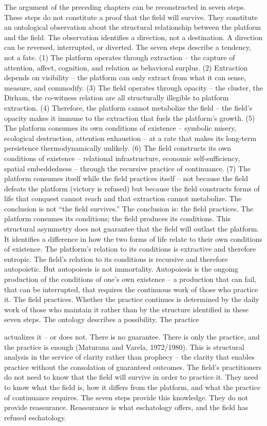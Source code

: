 The argument of the preceding chapters can be reconstructed in seven steps. These steps do not constitute a proof that the field will survive. They constitute an ontological observation about the structural relationship between the platform and the field. The observation identifies a direction, not a destination. A direction can be reversed, interrupted, or diverted. The seven steps describe a tendency, not a fate. (1) The platform operates through extraction – the capture of attention, affect, cognition, and relation as behavioral surplus. (2) Extraction depends on visibility – the platform can only extract from what it can sense, measure, and commodify. (3) The field operates through opacity – the cluster, the Dirham, the co-witness relation are all structurally illegible to platform extraction. (4) Therefore, the platform cannot metabolize the field – the field’s opacity makes it immune to the extraction that fuels the platform’s growth. (5) The platform consumes its own conditions of existence – symbolic misery, ecological destruction, attention exhaustion – at a rate that makes its long-term persistence thermodynamically unlikely. (6) The field constructs its own conditions of existence – relational infrastructure, economic self-sufficiency, spatial embeddedness – through the recursive practice of continuance. (7) The platform consumes itself while the field practices itself – not because the field defeats the platform (victory is refused) but because the field constructs forms of life that conquest cannot reach and that extraction cannot metabolize. The conclusion is not “the field survives.” The conclusion is: the field practices. The platform consumes its conditions; the field produces its conditions. This structural asymmetry does not guarantee that the field will outlast the platform. It identifies a difference in how the two forms of life relate to their own conditions of existence. The platform’s relation to its conditions is extractive and therefore entropic. The field’s relation to its conditions is recursive and therefore autopoietic. But autopoiesis is not immortality. Autopoiesis is the ongoing production of the conditions of one’s own existence – a production that can fail, that can be interrupted, that requires the continuous work of those who practice it. The field practices. Whether the practice continues is determined by the daily work of those who maintain it rather than by the structure identified in these seven steps. The ontology describes a possibility. The practice

actualizes it – or does not. There is no guarantee. There is only the practice, and the practice is enough (Maturana and Varela, 1972/1980). This is structural analysis in the service of clarity rather than prophecy – the clarity that enables practice without the consolation of guaranteed outcomes. The field’s practitioners do not need to know that the field will survive in order to practice it. They need to know what the field is, how it differs from the platform, and what the practice of continuance requires. The seven steps provide this knowledge. They do not provide reassurance. Reassurance is what eschatology offers, and the field has refused eschatology.

